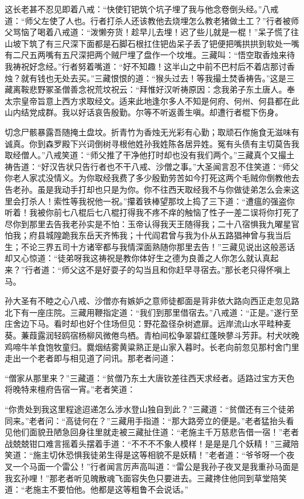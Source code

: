 \documentclass[12pt,UTF8]{ctexbook}
\begin{document}
这长老甚不忍见即着八戒：“快使钉钯筑个坑子埋了我与他念卷倒头经。”八戒道：“师父左使了人也。行者打杀人还该教他去烧埋怎么教老猪做土工？”行者被师父骂恼了喝着八戒道：“泼懒夯货！趁早儿去埋！迟了些儿就是一棍！”呆子慌了往山坡下筑了有三尺深下面都是石脚石根扛住钯齿呆子丢了钯便把嘴拱拱到软处一嘴有二尺五两嘴有五尺深把两个贼尸埋了盘作一个坟堆。三藏叫：“悟空取香烛来待我祷祝好念经。”行者努着嘴道：“好不知趣！这半山之中前不巴村后不着店那讨香烛？就有钱也无处去买。”三藏恨恨的道：“猴头过去！等我撮土焚香祷告。”这是三藏离鞍悲野冢圣僧善念祝荒坟祝云：“拜惟好汉听祷原因：念我弟子东土唐人。奉太宗皇帝旨意上西方求取经文。适来此地逢尔多人不知是何府、何州、何县都在此山内结党成群。我以好话哀告殷勤。尔等不听返善生嗔。却遭行者棍下伤身。

切念尸骸暴露吾随掩土盘坟。折青竹为香烛无光彩有心勤；取顽石作施食无滋味有诚真。你到森罗殿下兴词倒树寻根他姓孙我姓陈各居异姓。冤有头债有主切莫告我取经僧人。”八戒笑道：“师父推了干净他打时却也没有我们两个。”三藏真个又撮土祷告道：“好汉告状只告行者也不干八戒、沙僧之事。”大圣闻言忍不住笑道：“师父你老人家忒没情义。为你取经我费了多少殷勤劳苦如今打死这两个毛贼你倒教他去告老孙。虽是我动手打却也只是为你。你不往西天取经我不与你做徒弟怎么会来这里会打杀人！索性等我祝他一祝。”攥着铁棒望那坟上捣了三下道：“遭瘟的强盗你听着！我被你前七八棍后七八棍打得我不疼不痒的触恼了性子一差二误将你打死了尽你到那里去告我老孙实是不怕：玉帝认得我天王随得我；二十八宿惧我九曜星官怕我；府县城隍跪我东岳天齐怖我；十代阎君曾与我为仆从五路猖神曾与我当后生；不论三界五司十方诸宰都与我情深面熟随你那里去告！”三藏见说出这般恶话却又心惊道：“徒弟呀我这祷祝是教你体好生之德为良善之人你怎么就认真起来？”行者道：“师父这不是好耍子的勾当且和你赶早寻宿去。”那长老只得怀嗔上马。

孙大圣有不睦之心八戒、沙僧亦有嫉妒之意师徒都面是背非依大路向西正走忽见路北下有一座庄院。三藏用鞭指定道：“我们到那里借宿去。”八戒道：“正是。”遂行至庄舍边下马。看时却也好个住场但见：野花盈径杂树遮扉。远岸流山水平畦种麦葵。蒹葭露润轻鸥宿杨柳风微倦鸟栖。青柏间松争翠碧红蓬映蓼斗芳菲。村犬吠晚鸡啼牛羊食饱牧童归。爨烟结雾黄粱熟正是山家入暮时。长老向前忽见那村舍门里走出一个老者即与相见道了问讯。那老者问道：

“僧家从那里来？”三藏道：“贫僧乃东土大唐钦差往西天求经者。适路过宝方天色将晚特来檀府告宿一宵。”老者笑道：

“你贵处到我这里程途迢递怎么涉水登山独自到此？”三藏道：“贫僧还有三个徒弟同来。”老者问：“高徒何在？”三藏用手指道：“那大路旁立的便是。”老者猛抬头看见他们面貌丑陋急回身往里就走被三藏扯住道：“老施主千万慈悲告借一宿！”老者战兢兢钳口难言摇着头摆着手道：“不不不不象人模样！是是是几个妖精！”三藏陪笑道：“施主切休恐惧我徒弟生得是这等相貌不是妖精！”老者道：“爷爷呀一个夜叉一个马面一个雷公！”行者闻言厉声高叫道：“雷公是我孙子夜叉是我重孙马面是我玄孙哩！”那老者听见魄散魂飞面容失色只要进去。三藏搀住他同到草堂陪笑道：“老施主不要怕他。他都是这等粗鲁不会说话。”
\end{document}
